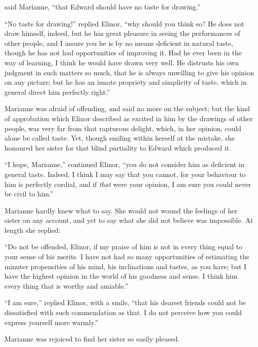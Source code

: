  said Marianne,
``that Edward should have no taste for drawing.''

``No taste for drawing!'' replied Elinor, ``why should
you think so? He does not draw himself, indeed, but he has
great pleasure in seeing the performances of other people,
and I assure you he is by no means deficient in natural taste,
though he has not had opportunities of improving it.
Had he ever been in the way of learning, I think he would
have drawn very well.  He distrusts his own judgment
in such matters so much, that he is always unwilling
to give his opinion on any picture; but he has an innate
propriety and simplicity of taste, which in general
direct him perfectly right.''

Marianne was afraid of offending, and said no more
on the subject; but the kind of approbation which Elinor
described as excited in him by the drawings of other
people, was very far from that rapturous delight, which,
in her opinion, could alone be called taste.  Yet, though
smiling within herself at the mistake, she honoured
her sister for that blind partiality to Edward which produced it.

``I hope, Marianne,'' continued Elinor, ``you do not
consider him as deficient in general taste.  Indeed, I think
I may say that you cannot, for your behaviour to him
is perfectly cordial, and if \emph{that} were your opinion,
I am sure you could never be civil to him.''

Marianne hardly knew what to say.  She would
not wound the feelings of her sister on any account,
and yet to say what she did not believe was impossible.
At length she replied:

``Do not be offended, Elinor, if my praise of him
is not in every thing equal to your sense of his merits.
I have not had so many opportunities of estimating the minuter
propensities of his mind, his inclinations and tastes,
as you have; but I have the highest opinion in the world
of his goodness and sense.  I think him every thing that is
worthy and amiable.''

``I am sure,'' replied Elinor, with a smile,
``that his dearest friends could not be dissatisfied
with such commendation as that.  I do not perceive
how you could express yourself more warmly.''

Marianne was rejoiced to find her sister so easily pleased.

